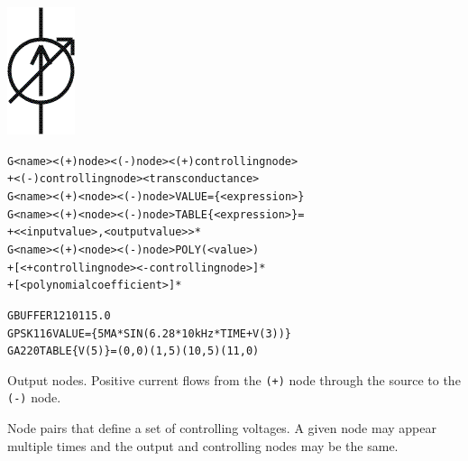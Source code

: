 



\begin{Device}\label{G_DEVICE}

\symbol
{\includegraphics{vccsSymbol}}

\device
\begin{alltt}
G<name> <(+) node> <(-) node> <(+) controlling node>
+ <(-) controlling node> <transconductance>
G<name> <(+) <node> <(-) node> VALUE = \{ <expression> \}
G<name> <(+) <node> <(-) node> TABLE \{ <expression> \} =
+ < <input value>,<output value> >*
G<name> <(+) <node> <(-) node> POLY(<value>)
+ [<+ controlling node> <- controlling node>]*
+ [<polynomial coefficient>]*
\end{alltt}

\examples
\begin{alltt}
GBUFFER 1 2 10 11 5.0
GPSK 11 6 VALUE = \{5MA*SIN(6.28*10kHz*TIME+V(3))\}
GA2 2 0 TABLE \{V(5)\} = (0,0) (1,5) (10,5) (11,0)
\end{alltt}

\parameters

\begin{Parameters}


Output nodes. Positive current flows from the \texttt{(+)} node through
the source to the \texttt{(-)} node.


Node pairs that define a set of controlling voltages. A given node may
appear multiple times and the output and controlling nodes may be the
same.


\end{Parameters}
\end{Device}

